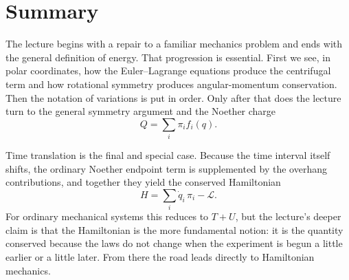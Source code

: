 \section{Summary}

The lecture begins with a repair to a familiar mechanics problem and ends with the general definition of energy. That progression is essential. First we see, in polar coordinates, how the Euler--Lagrange equations produce the centrifugal term and how rotational symmetry produces angular-momentum conservation. Then the notation of variations is put in order. Only after that does the lecture turn to the general symmetry argument and the Noether charge
\begin{equation}
Q=\sum_i \pi_i f_i(q).
\end{equation}

Time translation is the final and special case. Because the time interval itself shifts, the ordinary Noether endpoint term is supplemented by the overhang contributions, and together they yield the conserved Hamiltonian
\begin{equation}
H=\sum_i \dot q_i\,\pi_i-\mathcal{L}.
\end{equation}
For ordinary mechanical systems this reduces to \(T+U\), but the lecture's deeper claim is that the Hamiltonian is the more fundamental notion: it is the quantity conserved because the laws do not change when the experiment is begun a little earlier or a little later. From there the road leads directly to Hamiltonian mechanics.